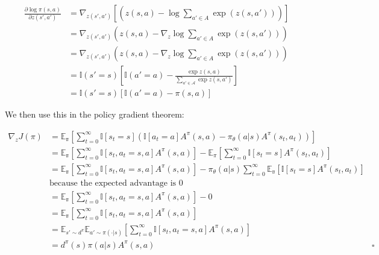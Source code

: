 \documentclass{article}
\newcommand{\grad}{\nabla}
\begin{document}
\begin{align*}
\frac{\partial\log \pi(s,a)}{\partial z(s', a')} &= \nabla_{z(s', a')}\left[(z(s,a) - \log \sum_{a'\in A} \exp(z(s,a'))) \right]\\
                        &= \nabla_{z(s', a')}(z(s,a) - \nabla_{z} \log \sum_{a'\in A} \exp(z(s,a')))\\
                        &= \nabla_{z(s', a')}(z(s,a) - \nabla_{z} \log \sum_{a'\in A} \exp(z(s,a')))\\
                        &= \mathbb{I}(s' = s) \left [ \mathbb{I}(a' = a) - \frac{\exp z(s,a)}{\sum_{a'\in \mathcal{A}} \exp z(s,a')}\right ]\\
                        &= \mathbb{I}(s' = s) \left [\mathbb{I}(a' = a) - \pi (s,a) \right]
\end{align*}




We then use this in the policy gradient theorem:




\begin{align*}
\grad_z J(\pi) &= \mathbb{E_\pi} \left [ \sum_{t=0}^\infty \mathbb{I}[ s_t = s] \left ( \mathbb{I}[a_t = a] A^{\pi}(s,a) - \pi_\theta(a|s)A^{\pi} (s_t, a_t) \right) \right]\\
               &= \mathbb{E_\pi} \left [ \sum_{t=0}^\infty \mathbb{I}[s_t, a_t = s, a] A^\pi (s,a) \right] - \mathbb{E}_\pi \left [ \sum _{t=0}^{\infty} \mathbb{I} [s_t = s] A^{\pi} (s_t, a_t)\right]\\
               &= \mathbb{E_\pi} \left [ \sum_{t=0}^\infty \mathbb{I}[s_t, a_t = s, a] A^\pi (s,a) \right] - \pi_\theta(a|s) \sum_{t=0}^\infty \mathbb{E_\pi} [\mathbb{I}[s_t = s] A^\pi (s_t, a_t)]\\
               &\text{because the expected advantage is 0}\\
               &= \mathbb{E_\pi} \left [ \sum_{t=0}^\infty \mathbb{I}[s_t, a_t = s, a] A^\pi (s,a) \right] - 0 \\
               &= \mathbb{E_\pi} \left [ \sum_{t=0}^\infty \mathbb{I}[s_t, a_t = s, a] A^\pi (s,a) \right]\\
               &= \mathbb{E}_{s' \sim d^\pi} \mathbb{E}_{a' \sim \pi(\cdot | s)} \left [ \sum_{t=0}^\infty \mathbb{I}[s_t, a_t = s, a] A^\pi (s,a) \right]\\
               &= d^\pi(s) \pi(a|s) A^\pi(s,a) &\square
\end{align*}
\end{document}
